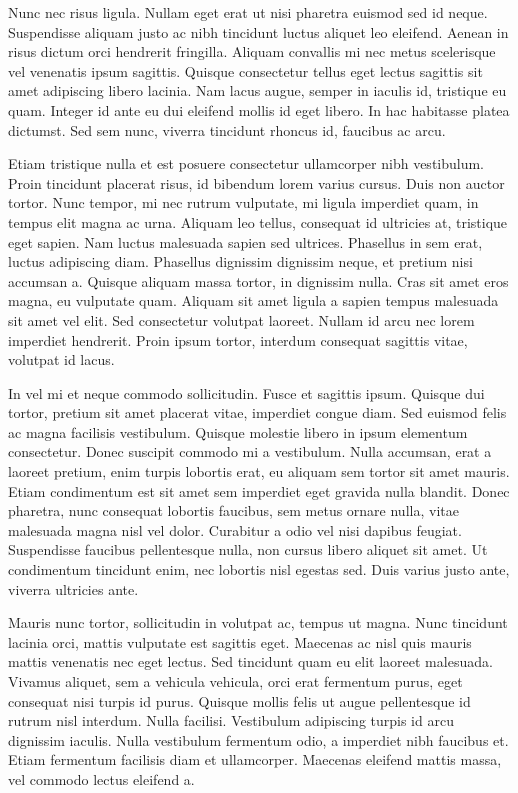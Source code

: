 \documentclass[12pt,lot,lof]{quthesis}
\begin{document}
Nunc nec risus ligula. Nullam eget erat ut nisi pharetra euismod sed id neque. Suspendisse aliquam justo ac nibh tincidunt luctus aliquet leo eleifend. Aenean in risus dictum orci hendrerit fringilla. Aliquam convallis mi nec metus scelerisque vel venenatis ipsum sagittis. Quisque consectetur tellus eget lectus sagittis sit amet adipiscing libero lacinia. Nam lacus augue, semper in iaculis id, tristique eu quam. Integer id ante eu dui eleifend mollis id eget libero. In hac habitasse platea dictumst. Sed sem nunc, viverra tincidunt rhoncus id, faucibus ac arcu.

Etiam tristique nulla et est posuere consectetur ullamcorper nibh vestibulum. Proin tincidunt placerat risus, id bibendum lorem varius cursus. Duis non auctor tortor. Nunc tempor, mi nec rutrum vulputate, mi ligula imperdiet quam, in tempus elit magna ac urna. Aliquam leo tellus, consequat id ultricies at, tristique eget sapien. Nam luctus malesuada sapien sed ultrices. Phasellus in sem erat, luctus adipiscing diam. Phasellus dignissim dignissim neque, et pretium nisi accumsan a. Quisque aliquam massa tortor, in dignissim nulla. Cras sit amet eros magna, eu vulputate quam. Aliquam sit amet ligula a sapien tempus malesuada sit amet vel elit. Sed consectetur volutpat laoreet. Nullam id arcu nec lorem imperdiet hendrerit. Proin ipsum tortor, interdum consequat sagittis vitae, volutpat id lacus.

In vel mi et neque commodo sollicitudin. Fusce et sagittis ipsum. Quisque dui tortor, pretium sit amet placerat vitae, imperdiet congue diam. Sed euismod felis ac magna facilisis vestibulum. Quisque molestie libero in ipsum elementum consectetur. Donec suscipit commodo mi a vestibulum. Nulla accumsan, erat a laoreet pretium, enim turpis lobortis erat, eu aliquam sem tortor sit amet mauris. Etiam condimentum est sit amet sem imperdiet eget gravida nulla blandit. Donec pharetra, nunc consequat lobortis faucibus, sem metus ornare nulla, vitae malesuada magna nisl vel dolor. Curabitur a odio vel nisi dapibus feugiat. Suspendisse faucibus pellentesque nulla, non cursus libero aliquet sit amet. Ut condimentum tincidunt enim, nec lobortis nisl egestas sed. Duis varius justo ante, viverra ultricies ante.

Mauris nunc tortor, sollicitudin in volutpat ac, tempus ut magna. Nunc tincidunt lacinia orci, mattis vulputate est sagittis eget. Maecenas ac nisl quis mauris mattis venenatis nec eget lectus. Sed tincidunt quam eu elit laoreet malesuada. Vivamus aliquet, sem a vehicula vehicula, orci erat fermentum purus, eget consequat nisi turpis id purus. Quisque mollis felis ut augue pellentesque id rutrum nisl interdum. Nulla facilisi. Vestibulum adipiscing turpis id arcu dignissim iaculis. Nulla vestibulum fermentum odio, a imperdiet nibh faucibus et. Etiam fermentum facilisis diam et ullamcorper. Maecenas eleifend mattis massa, vel commodo lectus eleifend a.
\end{document}
